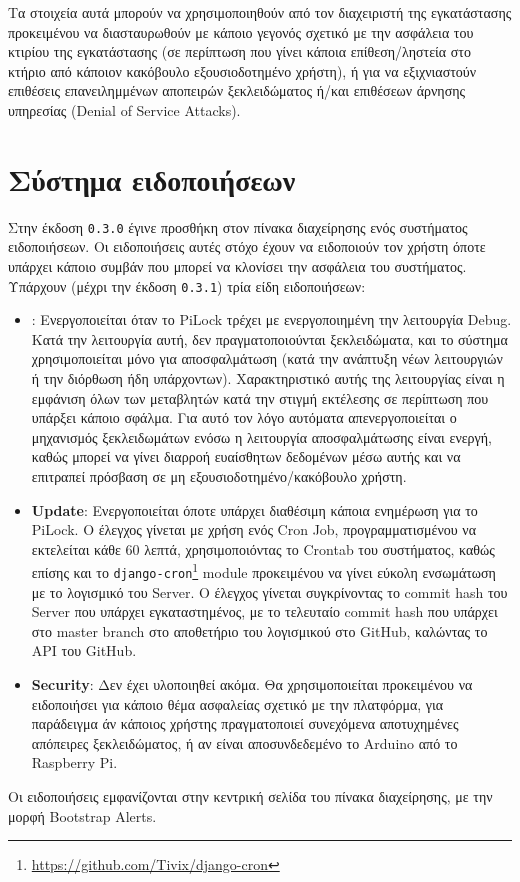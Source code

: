 	Τα στοιχεία αυτά μπορούν να χρησιμοποιηθούν από τον διαχειριστή της εγκατάστασης προκειμένου να διασταυρωθούν με κάποιο γεγονός σχετικό με την ασφάλεια του κτιρίου της εγκατάστασης (σε περίπτωση που γίνει κάποια επίθεση/ληστεία στο κτήριο από κάποιον κακόβουλο εξουσιοδοτημένο χρήστη), ή για να εξιχνιαστούν επιθέσεις επανειλημμένων αποπειρών ξεκλειδώματος ή/και επιθέσεων άρνησης υπηρεσίας (Denial of Service Attacks).

\section{Σύστημα ειδοποιήσεων}
	Στην έκδοση \verb|0.3.0| έγινε προσθήκη στον πίνακα διαχείρησης ενός συστήματος ειδοποιήσεων. Οι ειδοποιήσεις αυτές στόχο έχουν να ειδοποιούν τον χρήστη όποτε υπάρχει κάποιο συμβάν που μπορεί να κλονίσει την ασφάλεια του συστήματος. Υπάρχουν (μέχρι την έκδοση \verb|0.3.1|) τρία είδη ειδοποιήσεων:

	\begin{itemize}
		\item \textbf{}: Ενεργοποιείται όταν το PiLock τρέχει με ενεργοποιημένη την λειτουργία Debug. Κατά την λειτουργία αυτή, δεν πραγματοποιούνται ξεκλειδώματα, και το σύστημα χρησιμοποιείται μόνο για αποσφαλμάτωση (κατά την ανάπτυξη νέων λειτουργιών ή την διόρθωση ήδη υπάρχοντων). Χαρακτηριστικό αυτής της λειτουργίας είναι η εμφάνιση όλων των μεταβλητών κατά την στιγμή εκτέλεσης σε περίπτωση που υπάρξει κάποιο σφάλμα. Για αυτό τον λόγο αυτόματα απενεργοποιείται ο μηχανισμός ξεκλειδωμάτων ενόσω η λειτουργία αποσφαλμάτωσης είναι ενεργή, καθώς μπορεί να γίνει διαρροή ευαίσθητων δεδομένων μέσω αυτής και να επιτραπεί πρόσβαση σε μη εξουσιοδοτημένο/κακόβουλο χρήστη.
		\item \textbf{Update}: Ενεργοποιείται όποτε υπάρχει διαθέσιμη κάποια ενημέρωση για το PiLock. Ο έλεγχος γίνεται με χρήση ενός Cron Job, προγραμματισμένου να εκτελείται κάθε 60 λεπτά, χρησιμοποιόντας το Crontab του συστήματος, καθώς επίσης και το \verb|django-cron|\footnote{\url{https://github.com/Tivix/django-cron}} module προκειμένου να γίνει εύκολη ενσωμάτωση με το λογισμικό του Server. Ο έλεγχος γίνεται συγκρίνοντας το commit hash του Server που υπάρχει εγκαταστημένος, με το τελευταίο commit hash που υπάρχει στο master branch στο αποθετήριο του λογισμικού στο GitHub, καλώντας το API του GitHub.
		\item \textbf{Security}: Δεν έχει υλοποιηθεί ακόμα. Θα χρησιμοποιείται προκειμένου να ειδοποιήσει για κάποιο θέμα ασφαλείας σχετικό με την πλατφόρμα, για παράδειγμα άν κάποιος χρήστης πραγματοποιεί συνεχόμενα αποτυχημένες απόπειρες ξεκλειδώματος, ή αν είναι αποσυνδεδεμένο το Arduino από το Raspberry Pi.
	\end{itemize}

	Οι ειδοποιήσεις εμφανίζονται στην κεντρική σελίδα του πίνακα διαχείρησης, με την μορφή Bootstrap Alerts.

